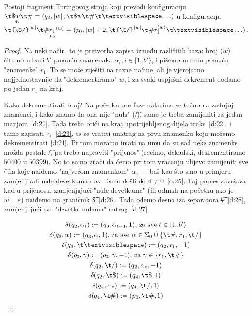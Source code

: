\begin{lema}\label{lm:faza2}
Postoji fragment Turingovog stroja koji prevodi konfiguraciju $\t\$\underset{q_2}{w}\t\#=(q_2,\left|w\right|,\t\$w\t\#\bl\ldots)$ u konfiguraciju $\t{\$/}^{\left|w\right|}\t\#\underset{p_0}{r_1}^{\kr w}=(p_0,\left|w\right|+2,\t{\$/}^{\left|w\right|}\t\#r_1^{\kr w}\bl\ldots)$.
\end{lema}

\begin{proof}
Na neki način, to je pretvorba zapisa između različitih baza: broj $\langle w\rangle$ čitamo u bazi $b'$ pomoću znamenaka $\alpha_i,i\in[1..b'\rangle$, i pišemo unarno pomoću "znamenke" $r_1$. To se može riješiti na razne načine, ali je vjerojatno najjednostavnije da "dekrementiramo" $w$, i za svaki uspješni dekrement dodamo po jedan $r_1$ na kraj.

Kako dekrementirati broj? Na početku ove faze nalazimo se točno na zadnjoj znamenci, i kako znamo da ona nije "nula" (\t/), samo je treba zamijeniti za jedan manjom~\eqref{d:21}. Tada treba otići na kraj upotrijebljenog dijela trake~\eqref{d:22}, i tamo zapisati $r_1$~\eqref{d:23}, te se vratiti unatrag na prvu znamenku koju možemo dekrementirati~\eqref{d:24}. Pritom moramo imati na umu da su sad neke znamenke možda postale \t/, pa treba napraviti "prijenos" (recimo, dekadski, dekrementiramo $50400$ u $50399$). No to samo znači da ćemo pri tom vraćanju ulijevo zamijeniti sve \t/ na koje naiđemo "najvećom znamenkom" $\alpha_z$ --- baš kao što smo u primjeru zamjenjivali nule devetkama dok nismo došli do $4\not=0$~\eqref{d:25}. Taj proces završava kad u prijenosu, zamjenjujući "nule devetkama" (ili odmah na početku ako je $w=\varepsilon$) naiđemo na graničnik \t\$~\eqref{d:26}. Tada odemo desno iza separatora \t\#~\eqref{d:28}, zamjenjujući sve "devetke nulama" natrag~\eqref{d:27}.

\noindent\begin{gather}
\label{d:21}
    \delta(q_2,\alpha_t):=(q_3,\alpha_{t-1},1)\text{, za sve }t\in[1..b'\rangle\\
\label{d:22}
    \delta(q_3,\alpha):=(q_3,\alpha,1)\text{, za sve }\alpha\in\Sigma_0\mathbin{\dot\cup}\{\t\#,r_1,\t/\}\\
\label{d:23}
    \delta(q_3,\bl):=(q_2,r_1,-1)\\
\label{d:24}
    \delta(q_2,\gamma):=(q_2,\gamma,-1)\text{, za }\gamma\in\{r_1,\t\#\}\\
\label{d:25}
    \delta(q_2,\t/):=(q_2,\alpha_z,-1)\\
\label{d:26}
    \delta(q_2,\t\$):=(q_4,\t\$,1)\\
\label{d:27}
    \delta(q_4,\alpha_z):=(q_4,\t/,1)\\
\label{d:28}
    \delta(q_4,\t\#):=(p_0,\t\#,1)
\end{gather}


\end{proof}
